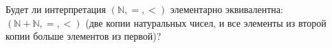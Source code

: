 Будет ли интерпретация $(\mathbb{N}, =, <)$ элементарно эквивалентна: $(\mathbb{N} + \mathbb{N}, =, <)$
(две копии натуральных чисел, и все элементы из второй копии больше элементов из первой)?
